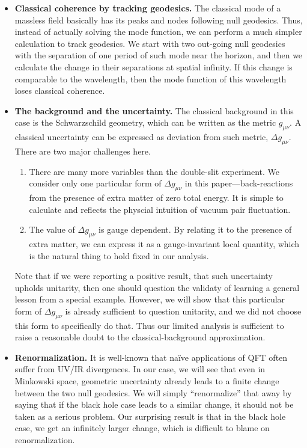 \documentclass[aps,showpacs,twocolumn,floats,prd,superscriptaddress,nofootinbib]{revtex4-1}
\begin{document}
\begin{itemize}
\item {\bf Classical coherence by tracking geodesics.} The classical mode of a massless field basically has its peaks and nodes following null geodesics.
Thus, instead of actually solving the mode function, we can perform a much simpler calculation to track geodesics.
We start with two out-going null geodesics with the separation of one period of such mode near the horizon, and then we calculate the change in their separations at spatial infinity.
If this change is comparable to the wavelength, then the mode function of this wavelength loses classical coherence.
\item {\bf The background and the uncertainty.} The classical background in this case is the Schwarzschild geometry, which can be written as the metric $g_{\mu\nu}$. 
A classical uncertainty can be expressed as deviation from such metric, $\Delta g_{\mu\nu}$. 
There are two major challenges here.
\begin{enumerate}
\item There are many more variables than the double-slit experiment. 
We consider only one particular form of $\Delta g_{\mu\nu}$ in this paper---back-reactions from the presence of extra matter of zero total energy. 
It is simple to calculate and reflects the physcial intuition of vacuum pair fluctuation.
\item The value of $\Delta g_{\mu\nu}$ is gauge dependent. 
By relating it to the presence of extra matter, we can express it as a gauge-invariant local quantity, which is the natural thing to hold fixed in our analysis.
\end{enumerate}
Note that if we were reporting a positive result, that such uncertainty upholds unitarity, then one should question the validaty of learning a general lesson from a special example. However, we will show that this particular form of $\Delta g_{\mu\nu}$ is already sufficient to question unitarity, and we did not choose this form to specifically do that. Thus our limited analysis is sufficient to raise a reasonable doubt to the classical-background approximation.
\item {\bf Renormalization.} It is well-known that na\"ive applications of QFT often suffer from UV/IR divergences.
In our case, we will see that even in Minkowski space, geometric uncertainty already leads to a finite change between the two null geodesics.
We will simply ``renormalize'' that away by saying that if the black hole case leads to a similar change, it should not be taken as a serious problem.
Our surprising result is that in the black hole case, we get an infinitely larger change, which is difficult to blame on renormalization.
\end{itemize}
\end{document}

